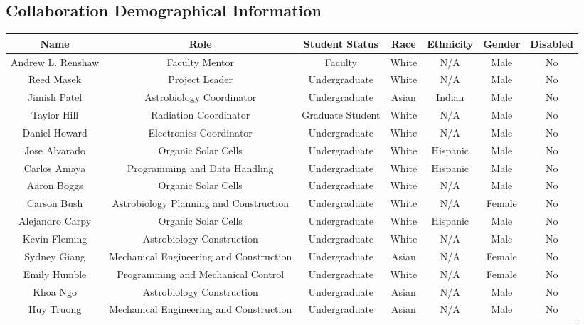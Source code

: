\begin{appendices}
  \section{Collaboration Demographical Information}
  \begin{table}[h!]
    \centering  
    \begin{tabular}  {ccccccc}
  	  \hline
	  \hline
      \textbf{Name} &  \textbf{Role} & \textbf{Student Status} & \textbf{Race} & \textbf{Ethnicity} & \textbf{Gender} & \textbf{Disabled}\\
 	  \hline
 	  Andrew L. Renshaw & Faculty Mentor & Faculty & White & N/A & Male & No\\ \hline
 	  Reed Masek & Project Leader & Undergraduate & White & N/A & Male & No\\ \hline
 	  Jimish Patel & Astrobiology Coordinator & Undergraduate & Asian & Indian & Male & No \\ \hline
      Taylor Hill & Radiation Coordinator & Graduate Student & White & N/A & Male & No\\ \hline
      Daniel Howard & Electronics Coordinator & Undergraduate & White & N/A & Male & No \\ \hline
      Jose Alvarado & Organic Solar Cells & Undergraduate & White & Hispanic & Male & No \\ \hline
      Carlos Amaya & Programming and Data Handling & Undergraduate & White & Hispanic & Male & No \\ \hline
      Aaron Boggs & Organic Solar Cells & Undergraduate & White & N/A & Male & No \\ \hline
      Carson Bush & Astrobiology Planning and Construction & Undergraduate & White & N/A & Female & No \\ \hline
      Alejandro Carpy & Organic Solar Cells & Undergraduate & White & Hispanic & Male & No \\ \hline
      Kevin Fleming & Astrobiology Construction & Undergraduate & White & N/A & Male & No \\ \hline
      Sydney Giang & Mechanical Engineering and Construction & Undergraduate & Asian & N/A & Female & No \\ \hline
      Emily Humble & Programming and Mechanical Control & Undergraduate & White & N/A & Female & No \\ \hline
      Khoa Ngo & Astrobiology Construction & Undergraduate & Asian & N/A & Male & No \\ \hline
      Huy Truong & Mechanical Engineering and Construction & Undergraduate & Asian & N/A & Male & No \\ \hline

\end{tabular}
\end{table}
\end{appendices}
